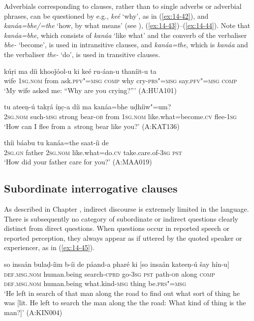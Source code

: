 Adverbials corresponding to clauses, rather than to single adverbs or adverbial phrases, can be questioned by e.g., \textit{keé} `why', as in (\ref{ex:14-42}), and \textit{kanáa=bhe/=the} `how, by what means' (see ), (\ref{ex:14-43})--(\ref{ex:14-44}). Note that \textit{kanáa=bhe}, which consists of \textit{kanáa} `like what' and the converb of the verbaliser \textit{bhe-} `become', is used in intransitive clauses, and \textit{kanáa=the}, which is \textit{kanáa} and the verbaliser \textit{the-} `do', is used in transitive clauses.

\begin{exe}
\ex
\label{ex:14-42}
\gll kúṛi ma díi khooǰóol-u ki keé  ru-áan-u thaníit-u ta \\
wife \textsc{1sg.nom} from ask.\textsc{pfv"=msg} \textsc{comp} why  cry-\textsc{prs"=msg} say.\textsc{pfv"=msg} \textsc{comp}\\
\glt `My wife asked me: ``Why are you crying?''' (A:HUA101)

\ex
\label{ex:14-43}
\gll tu ateeṇ-ú takṛá íṇc̣-a díi ma  kanáa=bhe uḍhíiw"=um? \\
\textsc{2sg.nom} such-\textsc{msg} strong bear-\textsc{ob} from \textsc{1sg.nom}  like.what=become.\textsc{cv} flee-\textsc{1sg} \\
\glt `How can I flee from a~strong bear like you?' (A:KAT136)

\ex
\label{ex:14-44}
\gll thíi báabu tu kanáa=the saat-íi de \\
\textsc{2sg.gn} father \textsc{2sg.nom} like.what=do.\textsc{cv} take.care.of-\textsc{3sg} \textsc{pst} \\
\glt `How did your father care for you?' (A:MAA019)
\end{exe}

\subsection{Subordinate interrogative clauses}
\label{subsec:14-2-3}


As described in Chapter , indirect discourse is extremely limited in the language. There is subsequently no category of subordinate or indirect questions clearly distinct from direct questions. When questions occur in reported speech or reported perception, they always appear as if uttered by the quoted speaker or experiencer, as in (\ref{ex:14-45}).

\begin{exe}
\ex
\label{ex:14-45}
\gll so insaán bulaḍ-íim b-íi de  páand-a pharé ki [so insaán  kateeṇ-ú šay hín-u] \\
\textsc{def.msg.nom} human.being search-\textsc{cprd} go-\textsc{3sg} \textsc{pst} path-\textsc{ob} along \textsc{comp} \textsc{def.msg.nom} human.being what.kind-\textsc{msg} thing be.\textsc{prs"=msg } \\
\glt `He left in search of that man along the road to find out what sort of thing he was [lit. He left to search the man along the the road: What kind of thing is the man?]' (A:KIN004)
\end{exe}

